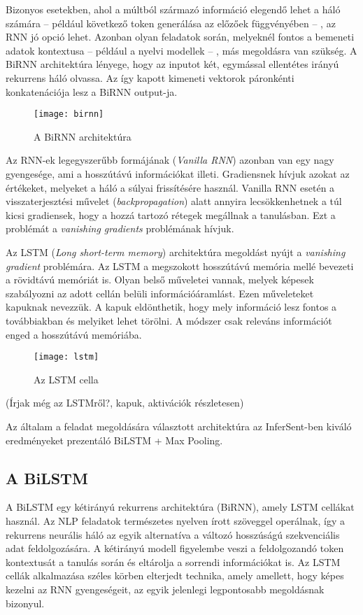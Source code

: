 Bizonyos esetekben, ahol a múltból származó információ elegendő lehet a háló számára – például következő token generálása az előzőek függvényében – , az RNN jó opció lehet. Azonban olyan feladatok során, melyeknél fontos a bemeneti adatok kontextusa – például a nyelvi modellek – , más megoldásra van szükség. A BiRNN architektúra lényege, hogy az inputot két, egymással ellentétes irányú rekurrens háló olvassa. Az így kapott kimeneti vektorok páronkénti konkatenációja lesz a BiRNN output-ja.

\begin{figure}[H]
	\centering
	\texttt{[image: birnn]}
	\caption{A BiRNN architektúra}
\end{figure}

Az RNN-ek legegyszerűbb formájának (\textit{Vanilla RNN}) azonban van egy nagy gyengesége, ami a hosszútávú információkat illeti. Gradiensnek hívjuk azokat az értékeket, melyeket a háló a súlyai frissítésére használ. Vanilla RNN esetén a visszaterjesztési művelet (\textit{backpropagation}) alatt annyira lecsökkenhetnek a túl kicsi gradiensek, hogy a hozzá tartozó rétegek megállnak a tanulásban. Ezt a problémát a \textit{vanishing gradients} problémának hívjuk.

Az LSTM (\textit{Long short-term memory}) architektúra megoldást nyújt a \textit{vanishing gradient} problémára. Az LSTM a megszokott hosszútávú memória mellé bevezeti a rövidtávú memóriát is. Olyan belső műveletei vannak, melyek képesek szabályozni az adott cellán belüli információáramlást. Ezen műveleteket kapuknak nevezzük. A kapuk eldönthetik, hogy mely információ lesz fontos a továbbiakban és melyiket lehet törölni. A módszer csak releváns információt enged a hosszútávú memóriába.

\begin{figure}[H]
	\centering
	\texttt{[image: lstm]}
	\caption{Az LSTM cella}
\end{figure}

(Írjak még az LSTMről?, kapuk, aktivációk részletesen)

Az általam a feladat megoldására választott architektúra az InferSent-ben kiváló eredményeket prezentáló BiLSTM + Max Pooling.

\subsection{A BiLSTM}
A BiLSTM egy kétirányú rekurrens architektúra (BiRNN), amely LSTM cellákat használ. Az NLP feladatok természetes nyelven írott szöveggel operálnak, így a rekurrens neurális háló az egyik alternatíva a változó hosszúságú szekvenciális adat feldolgozására. A kétirányú modell figyelembe veszi a feldolgozandó token kontextusát a tanulás során és eltárolja a sorrendi információkat is. Az LSTM cellák alkalmazása széles körben elterjedt technika, amely amellett, hogy képes kezelni az RNN gyengeségeit, az egyik jelenlegi legpontosabb megoldásnak bizonyul.

